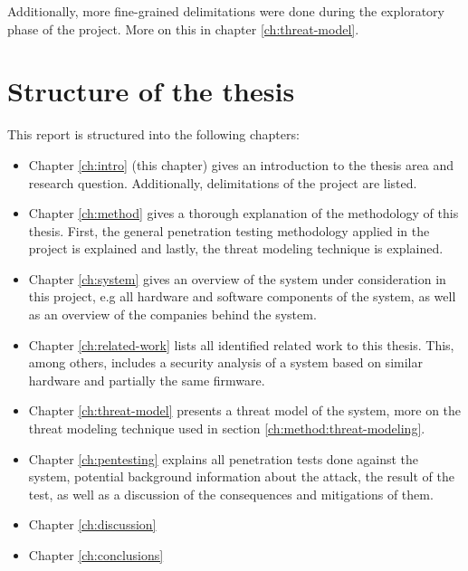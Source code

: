 \noindent Additionally, more fine-grained delimitations were done during the exploratory phase of the project. More on this in chapter \ref{ch:threat-model}.

\section{Structure of the thesis} \label{ch:intro:structure}
This report is structured into the following chapters:
\begin{itemize}
    \item Chapter \ref{ch:intro} (this chapter) gives an introduction to the thesis area and research question. Additionally, delimitations of the project are listed.
    \item Chapter \ref{ch:method} gives a thorough explanation of the methodology of this thesis. First, the general penetration testing methodology applied in the project is explained and lastly, the threat modeling technique is explained.
    \item Chapter \ref{ch:system} gives an overview of the system under consideration in this project, e.g all hardware and software components of the system, as well as an overview of the companies behind the system.
    \item Chapter \ref{ch:related-work} lists all identified related work to this thesis. This, among others, includes a security analysis of a system based on similar hardware and partially the same firmware.
    \item Chapter \ref{ch:threat-model} presents a threat model of the system, more on the threat modeling technique used in section \ref{ch:method:threat-modeling}.
    \item Chapter \ref{ch:pentesting} explains all penetration tests done against the system, potential background information about the attack, the result of the test, as well as a discussion of the consequences and mitigations of them.
    \item Chapter \ref{ch:discussion} \todo
    \item Chapter \ref{ch:conclusions} \todo
\end{itemize}
